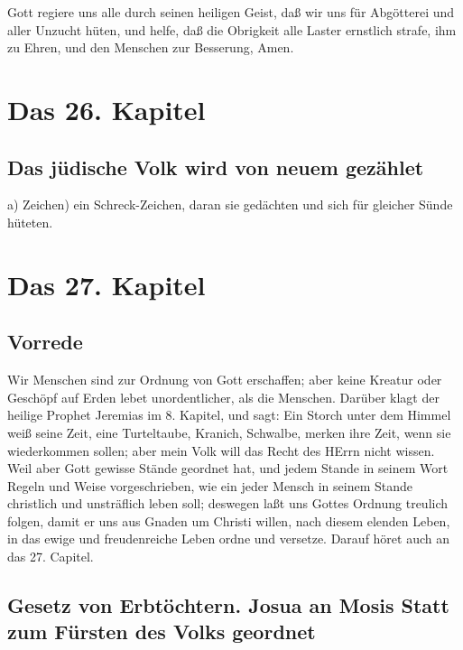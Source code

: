 Gott regiere uns alle durch seinen heiligen Geist, daß wir uns für Abgötterei und aller Unzucht hüten, und helfe, daß die Obrigkeit alle Laster ernstlich strafe, ihm zu Ehren, und den Menschen zur Besserung, Amen.

\chapter{Das 26. Kapitel}

\section{Das jüdische Volk wird von neuem gezählet}

a) Zeichen) ein Schreck-Zeichen, daran sie gedächten und sich für gleicher Sünde hüteten.

\chapter{Das 27. Kapitel}

\section{Vorrede}

Wir Menschen sind zur Ordnung von Gott erschaffen; aber keine Kreatur oder Geschöpf auf Erden lebet unordentlicher, als die Menschen. Darüber klagt der heilige Prophet Jeremias im 8. Kapitel, und sagt: Ein Storch unter dem Himmel weiß seine Zeit, eine Turteltaube, Kranich, Schwalbe, merken ihre Zeit, wenn sie wiederkommen sollen; aber mein Volk will das Recht des HErrn nicht wissen. Weil aber Gott gewisse Stände geordnet hat, und jedem Stande in seinem Wort Regeln und Weise vorgeschrieben, wie ein jeder Mensch in seinem Stande christlich und unsträflich leben soll; deswegen laßt uns Gottes Ordnung treulich folgen, damit er uns aus Gnaden um Christi willen, nach diesem elenden Leben, in das ewige und freudenreiche Leben ordne und versetze. Darauf höret auch an das 27. Capitel.

\section[Gesetz von Erbtöchtern. Josua an Mosis Statt zum]{Gesetz von Erbtöchtern. Josua an Mosis Statt zum Fürsten des Volks geordnet}

